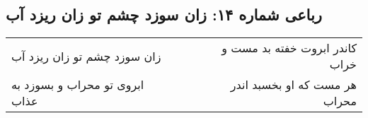 \begin{center}
\section*{رباعی شماره ۱۴: زان سوزد چشم تو زان ریزد آب}
\label{sec:sh014}
\begin{longtable}{l p{0.5cm} r}
زان سوزد چشم تو زان ریزد آب
&&
کاندر ابروت خفته بد مست و خراب
\\
ابروی تو محراب و بسوزد به عذاب
&&
هر مست که او بخسبد اندر محراب
\\
\end{longtable}
\end{center}
